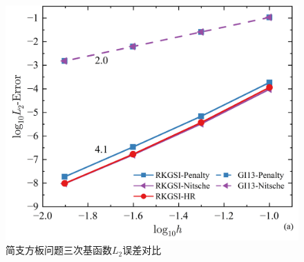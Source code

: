 \begin{figure}[H]
    \centering
    \includegraphics[scale=0.5]{figure/PHR/R/CL2.png}
    \caption{简支方板问题三次基函数$L_2$误差对比}\label{RCLH}
\end{figure}
